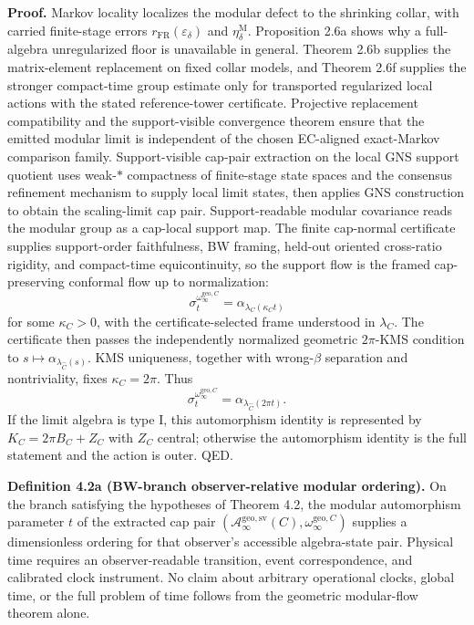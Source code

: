 \textbf{Proof.} Markov locality localizes the modular defect to the shrinking collar, with carried finite-stage errors \(r_{\mathrm{FR}}(\varepsilon_\delta)\) and \(\eta_\delta^{\mathrm M}\). Proposition 2.6a shows why a full-algebra unregularized floor is unavailable in general. Theorem 2.6b supplies the matrix-element replacement on fixed collar models, and Theorem 2.6f supplies the stronger compact-time group estimate only for transported regularized local actions with the stated reference-tower certificate. Projective replacement compatibility and the support-visible convergence theorem ensure that the emitted modular limit is independent of the chosen EC-aligned exact-Markov comparison family. Support-visible cap-pair extraction on the local GNS support quotient uses weak-\(*\) compactness of finite-stage state spaces and the consensus refinement mechanism to supply local limit states, then applies GNS construction to obtain the scaling-limit cap pair. Support-readable modular covariance reads the modular group as a cap-local support map. The finite cap-normal certificate supplies support-order faithfulness, BW framing, held-out oriented cross-ratio rigidity, and compact-time equicontinuity, so the support flow is the framed cap-preserving conformal flow up to normalization:
\[
\sigma_t^{\omega_\infty^{\mathrm{geo},C}}
=
\alpha_{\lambda_C(\kappa_C t)}
\]
for some \(\kappa_C>0\), with the certificate-selected frame understood in \(\lambda_C\). The
certificate then passes the independently normalized geometric \(2\pi\)-KMS condition to
\(s\mapsto\alpha_{\lambda_{\widehat C}(s)}\). KMS uniqueness, together with wrong-\(\beta\)
separation and nontriviality, fixes \(\kappa_C=2\pi\). Thus
\[
\sigma_t^{\omega_\infty^{\mathrm{geo},C}}
=
\alpha_{\lambda_{\widehat C}(2\pi t)}.
\]
If the limit algebra is type I, this automorphism identity is represented by
\(K_C=2\pi B_C+Z_C\) with \(Z_C\) central; otherwise the automorphism identity is the full
statement and the action is outer. QED.

\textbf{Definition 4.2a (BW-branch observer-relative modular ordering).}
On the branch satisfying the hypotheses of Theorem 4.2, the modular automorphism
parameter \(t\) of the extracted cap pair
\((\mathcal A_\infty^{\mathrm{geo,sv}}(C),\omega_\infty^{\mathrm{geo},C})\) supplies a
dimensionless ordering for that observer's accessible algebra-state pair. Physical time requires
an observer-readable transition, event correspondence, and calibrated clock instrument. No claim
about arbitrary operational clocks, global time, or the full problem of time follows from the
geometric modular-flow theorem alone.

